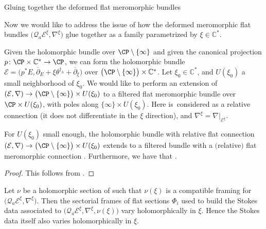 \begin{subsubsection}{Gluing together the deformed flat meromorphic bundles}

Now we would like to address the issue of how the deformed meromorphic flat bundles $\bigl(\mathcal{Q}_a\mathcal{E}^{\xi},\nabla^{\xi}\bigr)$ glue together as a family parametrized by $\xi \in \mathbb{C}^{*}$.

Given the holomorphic bundle  over $\CP\setminus \{\infty\}$ and given the canonical projection $p\colon\CP \times \mathbb{C}^*\to \CP$, we can form the holomorphic bundle $\mathcal{E}=\bigl(p^*E,\overline{\partial}_E+\xi \theta^{\dagger_h}+\overline{\partial}_{\xi}\bigr)$ over $\bigl(\CP\setminus \{\infty\} \bigr)\times \mathbb{C}^*$. Let $\xi_0 \in \mathbb{C}^*$, and $U(\xi_0)$ a small neighborhood of $\xi_0$. We would like to perform an extension of $(\mathcal{E},\nabla)\to \bigl(\CP\setminus \{\infty\}\bigr)\times U(\xi_0)$ to a filtered flat meromorphic bundle over $\CP\times U(\xi_0)$, with poles along $\{\infty\}\times U(\xi_0)$. Here  is~considered as a relative connection (it does not differentiate in the $\xi$ direction), and $\nabla^{\xi}=\nabla|_{\mathcal{E}^{\xi}}$.

\begin{Theorem} For $U(\xi_0)$ small enough, the holomorphic bundle with relative flat connection $(\mathcal{E},\nabla)\to \bigl(\CP \setminus \{\infty\}\bigr)\times U(\xi_0)$ extends to a filtered bundle with a $($relative$)$ flat meromorphic connection . Furthermore, we have that .
\end{Theorem}

\begin{proof}
This follows from \cite[Proposition 9.2.1, Corollary 9.2.5, and Theorem 11.1.2]{M}.
\end{proof}

\begin{Theorem} \label{holStokes} Let $\nu$ be a holomorphic section of  such that $\nu(\xi)$ is a compatible framing for $\bigl(\mathcal{Q}_a\mathcal{E}^{\xi},\nabla^{\xi}\bigr)$. Then the sectorial frames of flat sections $\Phi_i$ used to build the Stokes data associated to $\bigl(\mathcal{Q}_a\mathcal{E}^{\xi},\nabla^{\xi},\nu(\xi)\bigr)$ vary holomorphically in $\xi$. Hence the Stokes data itself also varies holomorphically in $\xi$.
\end{Theorem}


\end{subsubsection}
